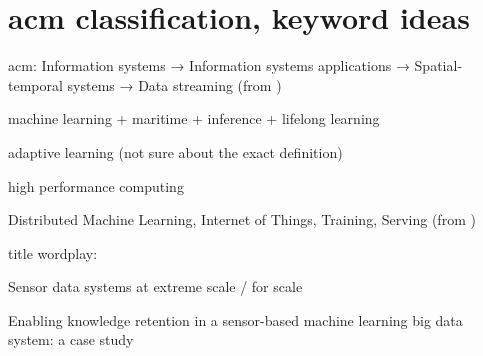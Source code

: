 \section{acm classification,  keyword ideas}

acm:
Information systems → Information systems applications →
Spatial-temporal systems → Data streaming (from \cite{uprctrajectorysystem})

machine learning + maritime + inference + lifelong learning

adaptive learning (not sure about the exact definition)

high performance computing

Distributed Machine Learning, Internet of Things, Training, Serving (from \cite{mliot})

title wordplay:

Sensor data systems at extreme scale / for scale

Enabling knowledge retention in a sensor-based machine learning big data system: a case study

